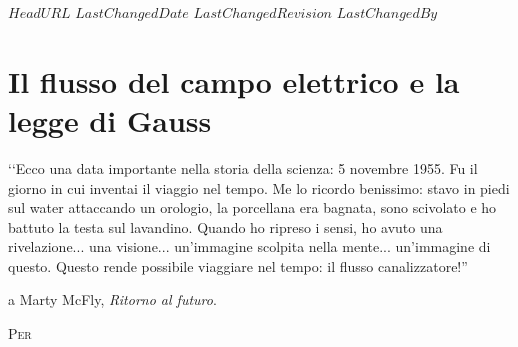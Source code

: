 \svnidlong
{$HeadURL$}
{$LastChangedDate$}
{$LastChangedRevision$}
{$LastChangedBy$}

\chapter{Il flusso del campo elettrico e la legge di Gauss}

\begin{introduction}
	‘‘Ecco una data importante nella storia della scienza: 5 novembre 1955. Fu il giorno in cui inventai il viaggio nel tempo. Me lo ricordo benissimo: stavo in piedi sul water attaccando un orologio, la porcellana era bagnata, sono scivolato e ho battuto la testa sul lavandino. Quando ho ripreso i sensi, ho avuto una rivelazione... una visione... un'immagine scolpita nella mente... un'immagine
	di questo. Questo rende possibile viaggiare nel tempo: il flusso canalizzatore!''
	\begin{flushright}
		 a Marty McFly, \textit{Ritorno al futuro}.
	\end{flushright}
\end{introduction}
\lettrine[findent=1pt, nindent=0pt]{P}{er}  %
